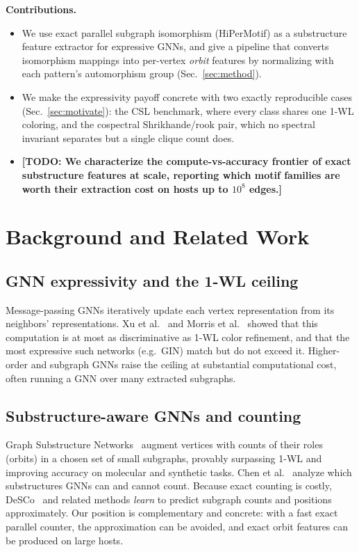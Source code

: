 \documentclass[conference]{IEEEtran}
\newcommand{\todo}[1]{{\color{red}\textbf{[TODO: #1]}}}
\begin{document}
\noindent\textbf{Contributions.}
\begin{itemize}
  \item We use exact parallel subgraph isomorphism (HiPerMotif) as a substructure
        feature extractor for expressive GNNs, and give a pipeline that converts
        isomorphism mappings into per-vertex \emph{orbit} features by normalizing
        with each pattern's automorphism group (Sec.~\ref{sec:method}).
  \item We make the expressivity payoff concrete with two exactly reproducible
        cases (Sec.~\ref{sec:motivate}): the CSL benchmark, where every class
        shares one 1-WL coloring, and the cospectral Shrikhande/rook pair, which no
        spectral invariant separates but a single clique count does.
  \item \todo{We characterize the compute-vs-accuracy frontier of exact
        substructure features at scale, reporting which motif families are worth
        their extraction cost on hosts up to $10^8$ edges.}
\end{itemize}

\section{Background and Related Work}\label{sec:background}

\subsection{GNN expressivity and the 1-WL ceiling}
Message-passing GNNs iteratively update each vertex representation from its
neighbors' representations. Xu et al.~\cite{xu2019gin} and Morris et
al.~\cite{morris2019} showed that this computation is at most as discriminative as
1-WL color refinement, and that the most expressive such networks (e.g.\ GIN) match
but do not exceed it. Higher-order and subgraph GNNs raise the ceiling at
substantial computational cost, often running a GNN over many extracted subgraphs.

\subsection{Substructure-aware GNNs and counting}
Graph Substructure Networks~\cite{bouritsas2022gsn} augment vertices with counts of
their roles (orbits) in a chosen set of small subgraphs, provably surpassing 1-WL
and improving accuracy on molecular and synthetic tasks. Chen et
al.~\cite{chen2020count} analyze which substructures GNNs can and cannot count.
Because exact counting is costly, DeSCo~\cite{fu2024desco} and related methods
\emph{learn} to predict subgraph counts and positions approximately. Our position
is complementary and concrete: with a fast exact parallel counter, the
approximation can be avoided, and exact orbit features can be produced on large
hosts.
\end{document}
